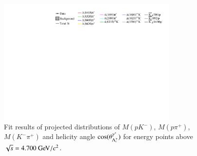 \begin{figure}[htbp]
    \includegraphics[width=0.80\textwidth]{figure/pwa_nominal/legend.pdf}

    \caption{Fit results of projected distributions of $M(pK^-)$, $M(p\pi^+)$, $M(K^-\pi^+)$  and helicity angle $\cos(\theta_{\Lambda_{c}^{+}}^{\gamma^*})$ for energy points above $\sqrt{s} = 4.700\gev/c^2$. }
\label{fig:pwa_fit_mass_1}
\end{figure}



